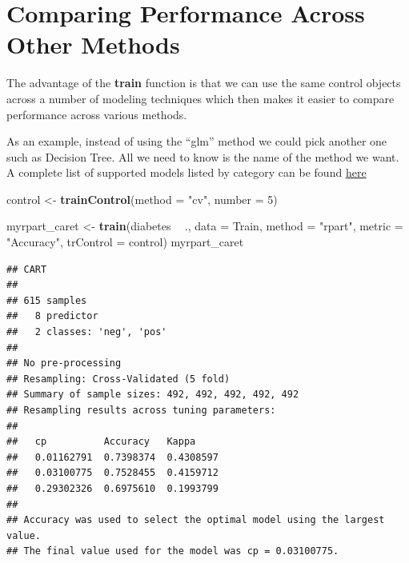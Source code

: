 \documentclass[]{book}
\newenvironment{Shaded}{\begin{snugshade}}{\end{snugshade}}
\newcommand{\KeywordTok}[1]{\textcolor[rgb]{0.13,0.29,0.53}{\textbf{#1}}}
\newcommand{\DataTypeTok}[1]{\textcolor[rgb]{0.13,0.29,0.53}{#1}}
\newcommand{\DecValTok}[1]{\textcolor[rgb]{0.00,0.00,0.81}{#1}}
\newcommand{\StringTok}[1]{\textcolor[rgb]{0.31,0.60,0.02}{#1}}
\newcommand{\CommentTok}[1]{\textcolor[rgb]{0.56,0.35,0.01}{\textit{#1}}}
\newcommand{\OperatorTok}[1]{\textcolor[rgb]{0.81,0.36,0.00}{\textbf{#1}}}
\newcommand{\NormalTok}[1]{#1}
\begin{document}
\begin{Shaded}
\end{Shaded}

\section{Comparing Performance Across Other
Methods}\label{comparing-performance-across-other-methods}

The advantage of the \textbf{train} function is that we can use the same
control objects across a number of modeling techniques which then makes
it easier to compare performance across various methods.

As an example, instead of using the ``glm'' method we could pick another
one such as Decision Tree. All we need to know is the name of the method
we want. A complete list of supported models listed by category can be
found \href{https://topepo.github.io/caret/available-models.html}{here}

\begin{Shaded}
\begin{Highlighting}[]
\NormalTok{control <-}\StringTok{ }\KeywordTok{trainControl}\NormalTok{(}\DataTypeTok{method =} \StringTok{"cv"}\NormalTok{, }\DataTypeTok{number =} \DecValTok{5}\NormalTok{)}

\NormalTok{myrpart_caret <-}\StringTok{ }\KeywordTok{train}\NormalTok{(diabetes }\OperatorTok{~}\StringTok{ }\NormalTok{.,}
                     \DataTypeTok{data =}\NormalTok{ Train,}
                     \DataTypeTok{method =} \StringTok{"rpart"}\NormalTok{,}
                     \DataTypeTok{metric =} \StringTok{"Accuracy"}\NormalTok{,}
                     \DataTypeTok{trControl =}\NormalTok{ control)}
\NormalTok{myrpart_caret}
\end{Highlighting}
\end{Shaded}

\begin{verbatim}
## CART 
## 
## 615 samples
##   8 predictor
##   2 classes: 'neg', 'pos' 
## 
## No pre-processing
## Resampling: Cross-Validated (5 fold) 
## Summary of sample sizes: 492, 492, 492, 492, 492 
## Resampling results across tuning parameters:
## 
##   cp          Accuracy   Kappa    
##   0.01162791  0.7398374  0.4308597
##   0.03100775  0.7528455  0.4159712
##   0.29302326  0.6975610  0.1993799
## 
## Accuracy was used to select the optimal model using the largest value.
## The final value used for the model was cp = 0.03100775.
\end{verbatim}
\end{document}
